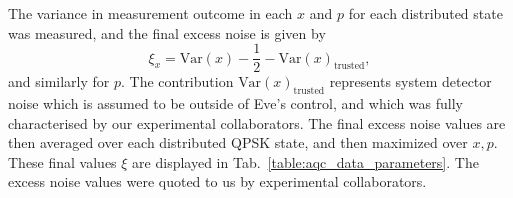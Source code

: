 The variance in measurement outcome in each $x$ and $p$ for each distributed state was measured, and the final excess noise is given by
\begin{equation}
\xi_{x} = \text{Var}\left(x\right) - \frac{1}{2} - \text{Var}\left(x\right)_{\text{trusted}},
\end{equation} %
and similarly for $p$. The contribution $\text{Var}\left(x\right)_{\text{trusted}}$ represents system detector noise which is assumed to be outside of Eve's control, and which was fully characterised by our experimental collaborators. The final excess noise values are then averaged over each distributed QPSK state, and then maximized over $x, p$. These final values $\xi$ are displayed in Tab.~\ref{table:aqc_data_parameters}. The excess noise values were quoted to us by experimental collaborators.



